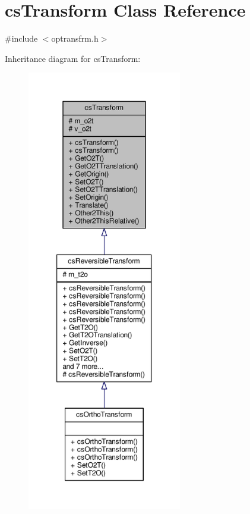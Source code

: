 \hypertarget{classcsTransform}{}\section{cs\+Transform Class Reference}
\label{classcsTransform}


{\ttfamily \#include $<$optransfrm.\+h$>$}



Inheritance diagram for cs\+Transform\+:
\nopagebreak
\begin{figure}[H]
\begin{center}
\leavevmode
\includegraphics[height=550pt]{df/d12/classcsTransform__inherit__graph}
\end{center}
\end{figure}


